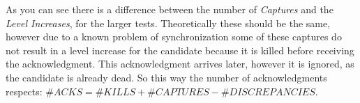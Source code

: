	\begin{table}[h] 
		\centering
		\caption{Tests summary}\label{tab:testtable}
	\end{table}

	As you can see there is a difference between the number of \textit{Captures} and the \textit{Level Increases}, for the larger tests. Theoretically these should be the same, however due to a known problem of synchronization some of these captures do not result in a level increase for the candidate because it is killed before receiving the acknowledgment. This acknowledgment arrives later, however it is ignored, as the candidate is already dead. So this way the number of acknowledgments respects: $\#ACKS = \#KILLS+\#CAPTURES-\#DISCREPANCIES$.

	\newpage


